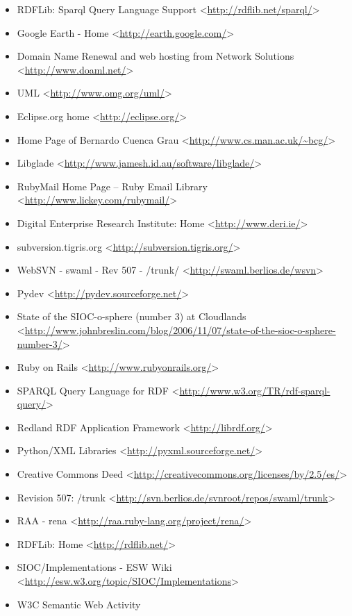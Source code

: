 \begin{itemize}
 \item RDFLib: Sparql Query Language Support
 <\url{http://rdflib.net/sparql/}>
 \item Google Earth - Home
 <\url{http://earth.google.com/}>
 \item Domain Name Renewal and web hosting from Network Solutions
 <\url{http://www.doaml.net/}>
 \item UML
 <\url{http://www.omg.org/uml/}>
 \item Eclipse.org home
 <\url{http://eclipse.org/}>
 \item Home Page of Bernardo Cuenca Grau
 <\url{http://www.cs.man.ac.uk/~bcg/}>
 \item Libglade
 <\url{http://www.jamesh.id.au/software/libglade/}>
 \item RubyMail Home Page -- Ruby Email Library
 <\url{http://www.lickey.com/rubymail/}>
 \item Digital Enterprise Research Institute: Home
 <\url{http://www.deri.ie/}>
 \item subversion.tigris.org
 <\url{http://subversion.tigris.org/}>
 \item WebSVN - swaml - Rev 507 - /trunk/
 <\url{http://swaml.berlios.de/wsvn}>
 \item Pydev
 <\url{http://pydev.sourceforge.net/}>
 \item State of the SIOC-o-sphere (number 3) at Cloudlands
 <\url{http://www.johnbreslin.com/blog/2006/11/07/state-of-the-sioc-o-sphere-number-3/}>
 \item Ruby on Rails
 <\url{http://www.rubyonrails.org/}>
 \item SPARQL Query Language for RDF
 <\url{http://www.w3.org/TR/rdf-sparql-query/}>
 \item Redland RDF Application Framework
 <\url{http://librdf.org/}>
 \item Python/XML Libraries
 <\url{http://pyxml.sourceforge.net/}>
 \item Creative Commons Deed
 <\url{http://creativecommons.org/licenses/by/2.5/es/}>
 \item Revision 507: /trunk
 <\url{http://svn.berlios.de/svnroot/repos/swaml/trunk}>
 \item RAA - rena
 <\url{http://raa.ruby-lang.org/project/rena/}>
 \item RDFLib: Home
 <\url{http://rdflib.net/}>
 \item SIOC/Implementations - ESW Wiki
 <\url{http://esw.w3.org/topic/SIOC/Implementations}>
 \item W3C Semantic Web Activity

\end{itemize}
